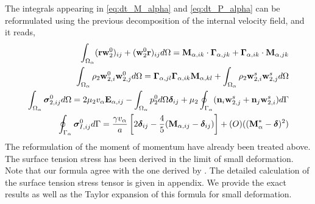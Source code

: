 The integrals appearing in \ref{eq:dt_M_alpha} and \ref{eq:dt_P_alpha} can be reformulated using the previous decomposition of the internal velocity field, and it reads, 
\begin{align}
    \int_{\Omega_{\alpha}} (\textbf{rw}_ 2^0 )_{ij}+ (\textbf{w}_2^0 \textbf{r})_{ij} d\Omega 
    = \textbf{M}_{\alpha,ik} \cdot \bm\Gamma_{\alpha,jk}
        +  \bm\Gamma_{\alpha,ik} \cdot \textbf{M}_{\alpha,jk}
    \\
    \int_{\Omega_{\alpha}} \rho_2 \textbf{w}_{2,i}^0\textbf{w}_{2,j}^0 d\Omega
    = \bm\Gamma_{\alpha,jl}\bm\Gamma_{\alpha,ik} \textbf{M}_{\alpha,kl}  
        +\int_{\Omega_{\alpha}} \rho_2 \textbf{w}_{2,i}^s\textbf{w}_{2,j}^s d\Omega
    \\
    \int_{\Omega_{\alpha}} \bm\sigma_{2,ij}^0 d\Omega
    =
    2 \mu_2 v_\alpha \textbf{E}_{\alpha,ij}
    - \int_{\Omega_{\alpha}} p_2^0 d\Omega \bm\delta_{ij}
    + \mu_2 \oint_{\Gamma_{\alpha}} (\textbf{n}_i \textbf{w}_{2,j}^s + \textbf{n}_j \textbf{w}_{2,i}^s) d\Gamma
    \\
    \oint_{\Gamma_{\alpha}} \bm\sigma_{I,ij}^0 d\Gamma
    = \frac{\gamma v_\alpha }{a} \left[
        2\bm\delta_{ij} 
        - \frac{4  }{5} (\textbf{M}_{\alpha,ij} - \bm\delta_{ij})
    \right]
    +\mathcal(O)((\textbf{M}_\alpha^*-\bm\delta)^2)\\
\end{align}
The reformulation of the moment of momentum have already been treated above. 
The surface tension stress has been derived in the limit of small deformation. 
Note that our formula agree with the one derived by \citet{lhuillier1987phenomenology}. 
The detailed calculation of the surface tension stress tensor is given in appendix. 
We provide the exact results as well as the Taylor expansion of this formula for small deformation. 

